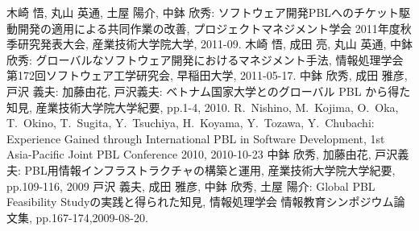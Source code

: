 \documentclass[a4j,9pt,twoside]{jarticle}
\newcommand{\me}{中鉢 欣秀}
\newcommand{\meen}{Y.~Chubachi}
\begin{document}
\begin{multicols}{2}
\begin{thebibliography}{99}
		 木崎 悟, 丸山 英通, 土屋 陽介, \me: ソフトウェア開発PBLへのチケット駆動開発の適用による共同作業の改善, プロジェクトマネジメント学会 2011年度秋季研究発表大会, 産業技術大学院大学, 2011-09.
		 木崎 悟, 成田 亮, 丸山 英通, \me: グローバルなソフトウェア開発におけるマネジメント手法, 情報処理学会 第172回ソフトウェア工学研究会, 早稲田大学, 2011-05-17.
		 \me, 成田 雅彦, 戸沢 義夫: 加藤由花, 戸沢義夫: ベトナム国家大学とのグローバル PBL から得た知見, 産業技術大学院大学紀要, pp.1-4, 2010. 
		 R.~Nishino, M.~Kojima, O.~Oka, T.~Okino, T.~Sugita, Y.~Tsuchiya, H.~Koyama, Y.~Tozawa, \meen: Experience Gained through International PBL in Software Development, 1st Asia-Pacific Joint PBL Conference 2010, 2010-10-23
		 \me, 加藤由花, 戸沢義夫: PBL用情報インフラストラクチャの構築と運用, 産業技術大学院大学紀要, pp.109-116, 2009
		 戸沢 義夫, 成田 雅彦, \me, 土屋 陽介: Global PBL Feasibility Studyの実践と得られた知見, 情報処理学会 情報教育シンポジウム論文集, pp.167-174,2009-08-20.

\end{thebibliography}
\end{multicols}
\end{document}
